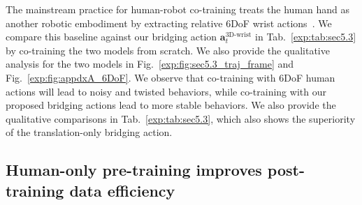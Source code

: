 The mainstream practice for human-robot co-training treats the human hand as another robotic embodiment by extracting relative 6DoF wrist actions~\cite{kareer2025egomimic,punamiya2025egobridge,zheng2026egoscale,cheang2025gr3}.
%
We compare this baseline against our bridging action $\mathbf{a}^{\text{3D-wrist}}_{t}$ in Tab.~\ref{exp:tab:sec5.3} by co-training the two models from scratch.
% 
We also provide the qualitative analysis for the two models in Fig.~\ref{exp:fig:sec5.3_traj_frame} and Fig.~\ref{exp:fig:appdxA_6DoF}.
%
We observe that co-training with 6DoF human actions will lead to noisy and twisted behaviors, while co-training with our proposed bridging actions lead to more stable behaviors.
% 
We also provide the qualitative comparisons in Tab.~\ref{exp:tab:sec5.3}, which also shows the superiority of the translation-only bridging action.



\begin{table}[htbp]
\centering
\caption{
    \textbf{Comparison on human action representation.}
    We compare 6DoF and translation-only (3DoF) human actions for human--robot co-training (from scratch).
    Our bridging action achieves better quantitative results on evaluation tasks.
}
\label{exp:tab:sec5.3}
\end{table}






\subsection{Human-only pre-training improves post-training data efficiency}
\label{exp:sec:few-shot}


